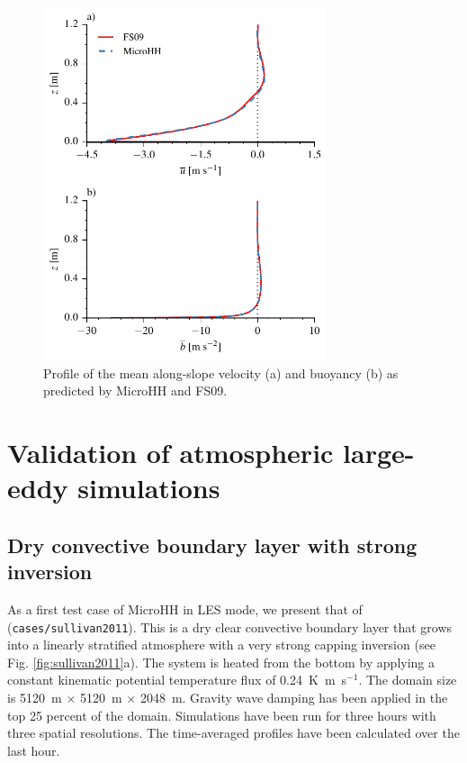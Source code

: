\documentclass[gmd,manuscript]{copernicus}
\begin{document}
\begin{figure}[t]
	\vspace*{2mm}
	\begin{center}
		\includegraphics[width=8.3cm]{figs/katabatic.pdf}
	\end{center}
	\caption{Profile of the mean along-slope velocity (a) and buoyancy (b) as predicted by MicroHH and FS09.}
	\label{fig:katabatic}
\end{figure}

\section{Validation of atmospheric large-eddy simulations}\label{sec:validation_atmos}
\subsection{Dry convective boundary layer with strong inversion}
As a first test case of MicroHH in LES mode, we present that of \citet{Sullivan2011} (\texttt{cases/sullivan2011}). This is a dry clear convective boundary layer that grows into a linearly stratified atmosphere with a very strong capping inversion (see Fig. \ref{fig:sullivan2011}a). The system is heated from the bottom by applying a constant kinematic potential temperature flux of 0.24~K~m~s$^{-1}$. The domain size is 5120~m $\times$ 5120~m $\times$ 2048~m. Gravity wave damping has been applied in the top 25 percent of the domain. Simulations have been run for three hours with three spatial resolutions. The time-averaged profiles have been calculated over the last hour.
\end{document}
